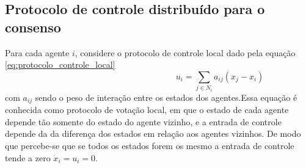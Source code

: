 \subsection{Protocolo de controle distribuído para o consenso}
Para cada agente $i$, considere o protocolo de controle local dado pela equação \ref{eq:protocolo_controle_local}
\begin{equation}\label{eq:protocolo_controle_local}
\hspace{6cm} %
    u_{i} = \sum\limits_{j \in N_{i}} a_{ij} (x_{j} - x_{i})
\end{equation}
com $a_{ij}$ sendo o peso de interação entre os estados dos agentes.Essa equação é conhecida como protocolo de votação local, em que o estado de cada agente depende tão somente do estado do agente vizinho, e a entrada de controle depende da da diferença dos estados em relação aos agentes vizinhos. De modo que percebe-se que se todos os estados forem os mesmo a entrada de controle tende a zero $\dot x_{i} = u_{i} = 0$.

